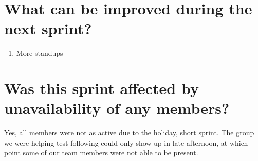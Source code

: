 \documentclass[11pt]{article}
\begin{document}
\section*{What can be improved during the next sprint?}
\begin{enumerate}
	\item More standups
\end{enumerate} 


\section*{Was this sprint affected by unavailability of any members?}
Yes, all members were not as active due to the holiday, short sprint. The group we were helping test following could only show up in late afternoon, at which point some of our team members were not able to be present.
\end{document}
